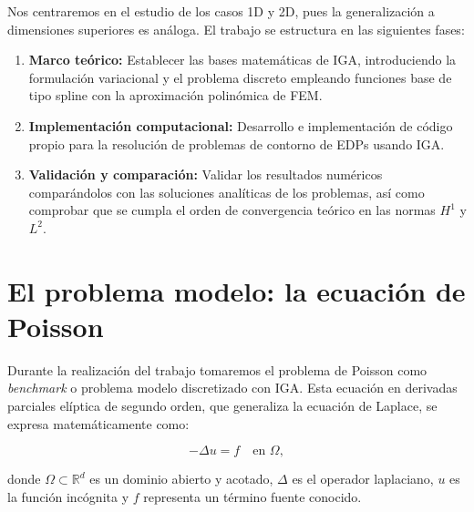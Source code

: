 \documentclass[11pt]{book}
\theoremstyle{plain} %
\theoremstyle{definition} %
\theoremstyle{definition} %
\newcommand\R{\mathbb{R}}
\begin{document}
Nos centraremos en el estudio de los casos 1D y 2D, pues la generalización a dimensiones superiores es análoga. 
El trabajo se estructura en las siguientes fases:

\vspace{-0.1cm}


\begin{enumerate}
    \item \textbf{Marco teórico:} Establecer las bases matemáticas de IGA, introduciendo la formulación variacional y el problema discreto empleando funciones base de tipo spline con la aproximación polinómica de FEM.
    \vspace{-0.1cm}
    \item \textbf{Implementación computacional:} Desarrollo e implementación de código propio para la resolución de problemas de contorno de EDPs usando IGA.
    \vspace{-0.1cm}
    \item \textbf{Validación y comparación:} Validar los resultados numéricos comparándolos con las soluciones analíticas de los problemas, así como comprobar que se cumpla el orden de convergencia teórico en las normas $H^1$ y $L^2$.
\end{enumerate}

\vspace{-0.7cm}

\section{El problema modelo: la ecuación de Poisson}

\vspace{-0.1cm}

Durante la realización del trabajo tomaremos el problema de Poisson como \textit{benchmark} o problema modelo discretizado con IGA.
Esta ecuación en derivadas parciales elíptica 
de segundo orden, que generaliza la ecuación de Laplace, se expresa matemáticamente como:

\vspace{-0.25cm}

$$-\Delta u = f \quad \text{en } \Omega,$$

\vspace{-0.1cm}

\noindent
donde $\Omega \subset \R^d$ es un dominio abierto y acotado, $\Delta$ es el operador laplaciano, $u$ es la 
función incógnita y $f$ representa un término fuente conocido.

\vspace{-0.2cm}
\end{document}
